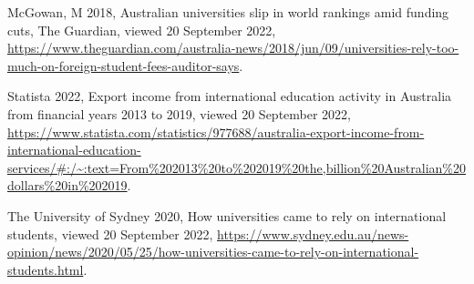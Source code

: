 \documentclass[
]{article}
\begin{document}
McGowan, M 2018, Australian universities slip in world rankings amid
funding cuts, The Guardian, viewed 20 September 2022,
\url{https://www.theguardian.com/australia-news/2018/jun/09/universities-rely-too-much-on-foreign-student-fees-auditor-says}.

Statista 2022, Export income from international education activity in
Australia from financial years 2013 to 2019, viewed 20 September 2022,
\url{https://www.statista.com/statistics/977688/australia-export-income-from-international-education-services/\#:/~:text=From\%202013\%20to\%202019\%20the,billion\%20Australian\%20dollars\%20in\%202019}.

The University of Sydney 2020, How universities came to rely on
international students, viewed 20 September 2022,
\url{https://www.sydney.edu.au/news-opinion/news/2020/05/25/how-universities-came-to-rely-on-international-students.html}.
\end{document}
